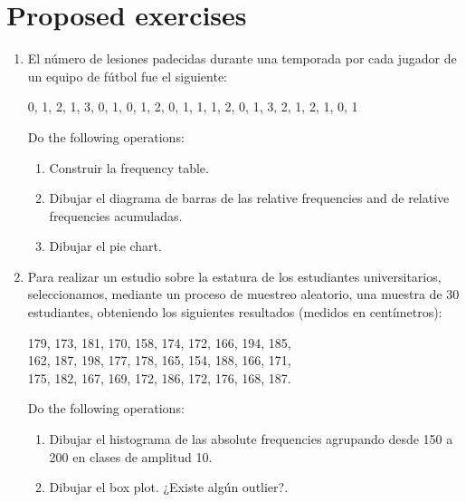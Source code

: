 \section{Proposed exercises}
\begin{enumerate}[leftmargin=*]

\item  El número de lesiones padecidas durante una temporada por cada jugador de un equipo de fútbol fue el siguiente:
\begin{center}
0, 1, 2, 1, 3, 0, 1, 0, 1, 2, 0, 1, 1, 1, 2, 0, 1, 3, 2, 1, 2, 1, 0, 1
\end{center}

Do the following operations:
\begin{enumerate}
\item Construir la frequency table.
\item Dibujar el diagrama de barras de las relative frequencies and de relative frequencies acumuladas.
\item Dibujar el pie chart.
\end{enumerate}

\item Para realizar un estudio sobre la estatura de los estudiantes universitarios, seleccionamos, mediante un proceso
de muestreo aleatorio, una muestra de 30 estudiantes, obteniendo los siguientes resultados (medidos en centímetros):
\begin{center}
179, 173, 181, 170, 158, 174, 172, 166, 194, 185,\\
162, 187, 198, 177, 178, 165, 154, 188, 166, 171,\\
175, 182, 167, 169, 172, 186, 172, 176, 168, 187.
\end{center}

Do the following operations:
\begin{enumerate}
\item Dibujar el histograma de las absolute frequencies agrupando desde 150 a 200 en clases de amplitud 10.
\item Dibujar el box plot. ¿Existe algún outlier?.
\end{enumerate}


\end{enumerate}
